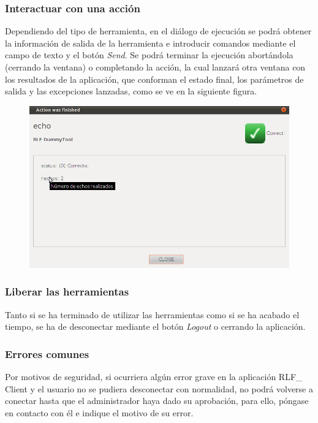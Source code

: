 \subsubsection*{Interactuar con una acción}
Dependiendo del tipo de herramienta, en el diálogo de ejecución se 
podrá obtener la información de salida de la herramienta e introducir 
comandos mediante el campo de texto y el botón \textit{Send}. Se 
podrá terminar la ejecución abortándola (cerrando la ventana) o 
completando la acción, la cual lanzará otra ventana con los 
resultados de la aplicación, que conforman el estado final, los 
parámetros de salida y las excepciones lanzadas, como se ve en la 
siguiente figura.

\begin{figure}[h]
	\centering
	\includegraphics[scale=0.5]{images/user/stopdialog.png}
\end{figure}

\subsubsection*{Liberar las herramientas}
Tanto si se ha terminado de utilizar las herramientas como si se ha 
acabado el tiempo, se ha de desconectar mediante el botón 
\textit{Logout} o cerrando la aplicación.

\subsubsection*{Errores comunes}
Por motivos de seguridad, si ocurriera algún error grave en la 
aplicación RLF\_ Client y el usuario no se pudiera desconectar con 
normalidad, no podrá volverse a conectar hasta que el administrador 
haya dado su aprobación, para ello, póngase en contacto con él e 
indique el motivo de su error.

